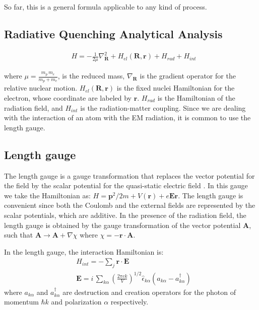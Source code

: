 So far, this is a general formula applicable to any kind of process.

\subsection{Radiative Quenching Analytical Analysis}

\begin{equation}\label{eqH1} 
\begin{split} 
& H = -\frac{1}{2\mu}\nabla^2_{\mathbf{R}} + H_{el}(\mathbf{R},\mathbf{r}) + H_{rad} + H_{int} 
\end{split} 
\end{equation} 

where $ \mu = \frac{m_p\,m_e}{m_p + m_e} $, is the reduced mass, $ \nabla_{\mathbf{R}} $ is the gradient operator for the relative nuclear motion. $ H_{el}(\mathbf{R},\mathbf{r}) $ is the fixed nuclei Hamiltonian for the electron, whose coordinate are labeled by $ \mathbf{r} $. $ H_{rad} $ is the Hamiltonian of the radiation field, and $ H_{int} $ is the radiation-matter coupling. Since we are dealing with the interaction of an atom with the EM radiation, it is common to use the length gauge.  

\subsection*{Length gauge}

The length gauge is a gauge transformation that replaces the vector potential for the field by the scalar potential for the quasi-static electric field \cite{LengthGauge3}.  In this gauge we take the Hamiltonian as: $ H = \mathbf{p}^2/2m + V(\mathbf{r})  + e\mathbf{E}\mathbf{r} $. The length gauge is convenient since both the Coulomb and the external fields are represented by the scalar potentials, which are additive. In the presence of the radiation field, the length gauge is obtained by the gauge transformation of the vector potential $ \mathbf{A} $, such that $ \mathbf{A} \rightarrow \mathbf{A} + \nabla \chi $ where $ \chi = - \mathbf{r} \cdot \mathbf{A} $. 

In the length gauge, the interaction Hamiltonian is:
\begin{equation}
\begin{split}
& H_{int} = -\sum_j{ \mathbf{r}\cdot\mathbf{E} } \\[.8em]
& \mathbf{E} = i\,\sum_{k\alpha}{\left(\frac{2\pi c k}{V}\right)^{1/2}\hat{\epsilon}_{k\alpha}\left(a_{k\alpha} - a^{\dagger}_{k\alpha}\right)}
\end{split}
\end{equation}
where $ a_{k\alpha} $ and $ a^{\dagger}_{k\alpha} $ are destruction and creation operators for the photon of momentum $ \hbar k $ and polarization $ \alpha $ respectively.

